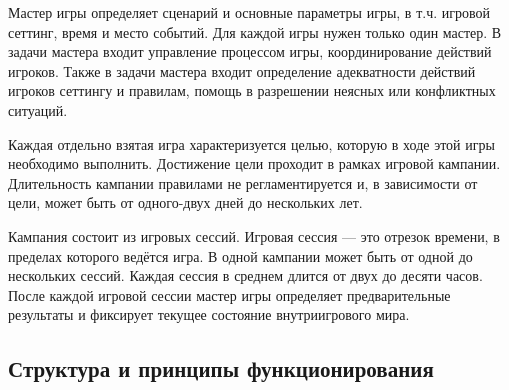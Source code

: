 Мастер игры определяет сценарий и основные параметры игры, в т.ч. игровой сеттинг, время и место событий. Для каждой игры нужен только один мастер. В задачи мастера входит управление процессом игры, координирование действий игроков. Также в задачи мастера входит определение адекватности действий игроков сеттингу и правилам, помощь в разрешении неясных или конфликтных ситуаций.

Каждая отдельно взятая игра характеризуется целью, которую в ходе этой игры необходимо выполнить. Достижение цели проходит в рамках игровой кампании. Длительность кампании правилами не регламентируется и, в зависимости от цели, может быть от одного-двух дней до нескольких лет.

Кампания состоит из игровых сессий. Игровая сессия — это отрезок времени, в пределах которого ведётся игра. В одной кампании может быть от одной до нескольких сессий. Каждая сессия в среднем длится от двух до десяти часов. После каждой игровой сессии мастер игры определяет предварительные результаты и фиксирует текущее состояние внутриигрового мира.


\subsection{Структура и принципы функционирования}

